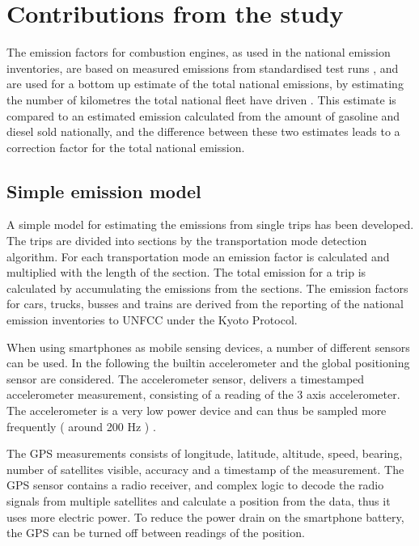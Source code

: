 \section {Contributions from the study}\label{contributions}
The emission factors for combustion engines, as used in the national emission inventories, are based on measured emissions from standardised test runs \cite{Andre2004}, and are used for a bottom up estimate of the total national emissions, by estimating the number of kilometres the total national fleet have driven \cite{nielsen2014}. This estimate is compared to an estimated emission calculated from the amount of gasoline and diesel sold nationally, and the difference between these two estimates leads to a correction factor for the total national emission.

\subsection{Simple emission model}

A simple model for estimating the emissions from single trips has been developed. The trips are divided into sections by the transportation mode detection algorithm. For each transportation mode an emission factor is calculated and multiplied with the length of the section. The total emission for a trip is calculated by accumulating the emissions from the sections. The emission factors for cars, trucks, busses and trains are derived from the reporting of the national emission inventories to UNFCC under the Kyoto Protocol. 

When using smartphones as mobile sensing devices, a number of different sensors can be used. In the following the builtin accelerometer and the global positioning sensor are considered. The accelerometer sensor, delivers a timestamped accelerometer measurement, consisting of a reading of the 3 axis accelerometer. The accelerometer is a very low power device and can thus be sampled more frequently ( around 200 Hz ) \cite{Kjaergaard2009}.

The GPS measurements consists of longitude, latitude, altitude, speed, bearing, number of satellites visible, accuracy and a timestamp of the measurement. The GPS sensor contains a radio receiver, and complex logic to decode the radio signals from multiple satellites and calculate a position from the data, thus it uses more electric power. To reduce the power drain on the smartphone battery, the GPS can be turned off between readings of the position. 



